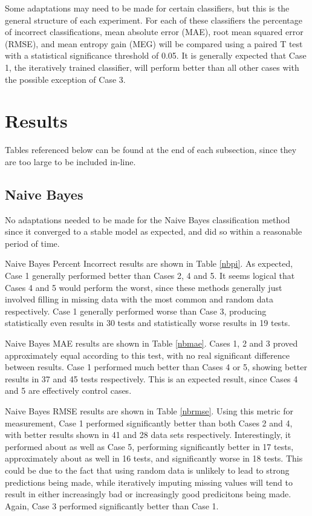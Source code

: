 Some adaptations may need to be made for certain classifiers, but this is the general structure of each experiment. For each of these classifiers the percentage of incorrect classifications, mean absolute error (MAE), root mean squared error (RMSE), and mean entropy gain (MEG) will be compared using a paired T test with a statistical significance threshold of 0.05. It is generally expected that Case 1, the iteratively trained classifier, will perform better than all other cases with the possible exception of Case 3.

\section{Results}

Tables referenced below can be found at the end of each subsection, since they are too large to be included in-line.

\subsection{Naive Bayes}
No adaptations needed to be made for the Naive Bayes classification method since it converged to a stable model as expected, and did so within a reasonable period of time.

Naive Bayes Percent Incorrect results are shown in Table \ref{nbpi}. As expected, Case 1 generally performed better than Cases 2, 4 and 5. It seems logical that Cases 4 and 5 would perform the worst, since these methods generally just involved filling in missing data with the most common and random data respectively. Case 1 generally performed worse than Case 3, producing statistically even results in 30 tests and statistically worse results in 19 tests.

Naive Bayes MAE results are shown in Table \ref{nbmae}. Cases 1, 2 and 3 proved approximately equal according to this test, with no real significant difference between results. Case 1 performed much better than Cases 4 or 5, showing better results in 37 and 45 tests respectively. This is an expected result, since Cases 4 and 5 are effectively control cases.

Naive Bayes RMSE results are shown in Table \ref{nbrmse}. Using this metric for measurement, Case 1 performed significantly better than both Cases 2 and 4, with better results shown in 41 and 28 data sets respectively. Interestingly, it performed about as well as Case 5, performing significantly better in 17 tests, approximately about as well in 16 tests, and significantly worse in 18 tests. This could be due to the fact that using random data is unlikely to lead to strong predictions being made, while iteratively imputing missing values will tend to result in either increasingly bad or increasingly good predicitons being made. Again, Case 3 performed significantly better than Case 1.

